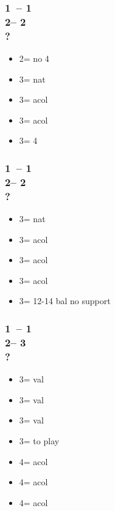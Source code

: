 \documentclass[12pt, a4paper]{report}
\begin{document}
\begin{bidpage}
\subsubsection*{1\clubs\ -- 1\clubs\\
                2\diams -- 2\spades\\
                ?}
\begin{itemize}
    \item 2\nt = no 4\spades
    \item 3\clubs = nat \clubs
    \item 3\diams = acol
    \item 3\hearts = acol
    \item 3\spades = 4\spades
\end{itemize}
\end{bidpage}

\begin{bidpage}
\subsubsection*{1\clubs\ -- 1\clubs\\
                2\diams -- 2\nt\\
                ?}
\begin{itemize}
    \item 3\clubs = nat \clubs
    \item 3\diams = acol
    \item 3\hearts = acol
    \item 3\spades = acol
    \item 3\nt = 12-14 bal no \clubs support
\end{itemize}
\end{bidpage}


\begin{bidpage}
\subsubsection*{1\clubs\ -- 1\clubs\\
                2\diams -- 3\clubs\\
                ?}
\begin{itemize}
    \item 3\diams = val
    \item 3\hearts = val
    \item 3\spades = val
    \item 3\nt = to play
    \item 4\clubs = acol \diams
    \item 4\diams = acol \hearts
    \item 4\hearts = acol \spades
\end{itemize}
\end{bidpage}
\end{document}
